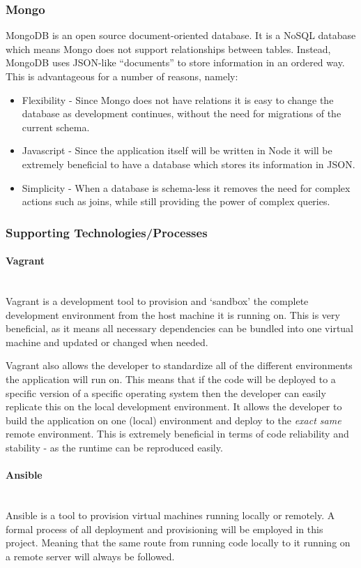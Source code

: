 \documentclass{article}
\begin{document}
\subsubsection{Mongo}
MongoDB is an open source document-oriented database. It is a NoSQL database which means Mongo does not support relationships between tables. Instead, MongoDB uses JSON-like ``documents'' to store information in an ordered way. This is advantageous for a number of reasons, namely:

\begin{itemize}
  \item Flexibility - Since Mongo does not have relations it is easy to change the database as development continues, without the need for migrations of the current schema.
  \item Javascript - Since the application itself will be written in Node it will be extremely beneficial to have a database which stores its information in JSON.
  \item Simplicity - When a database is schema-less it removes the need for complex actions such as joins, while still providing the power of complex queries.
\end{itemize}

\subsubsection{Supporting Technologies/Processes}
\label{subs:support}
\paragraph{Vagrant}\mbox{}\\
Vagrant is a development tool to provision and `sandbox' the complete development environment from the host machine it is running on. This is very beneficial, as it means all necessary dependencies can be bundled into one virtual machine and updated or changed when needed. 

Vagrant also allows the developer to standardize all of the different environments the application will run on. This means that if the code will be deployed to a specific version of a specific operating system then the developer can easily replicate this on the local development environment. It allows the developer to build the application on one (local) environment and deploy to the \textit{exact same} remote environment. This is extremely beneficial in terms of code reliability and stability - as the runtime can be reproduced easily.
\paragraph{Ansible}\mbox{}\\
Ansible is a tool to provision virtual machines running locally or remotely. A formal process of all deployment and provisioning will be employed in this project. Meaning that the same route from running code locally to it running on a remote server will always be followed.
\end{document}
